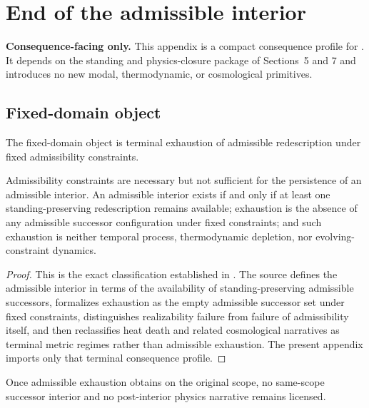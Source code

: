 \section{End of the admissible interior}
\label{app:interior-end}

\begin{fixedbox}
\textbf{Consequence-facing only.} This appendix is a compact consequence profile for \interiorenddoc{}. It depends on the standing and physics-closure package of Sections~5 and 7 and introduces no new modal, thermodynamic, or cosmological primitives.
\end{fixedbox}

\subsection*{Fixed-domain object}
The fixed-domain object is terminal exhaustion of admissible redescription under fixed admissibility constraints.

\begin{proposition}
Admissibility constraints are necessary but not sufficient for the persistence of an admissible interior. An admissible interior exists if and only if at least one standing-preserving redescription remains available; exhaustion is the absence of any admissible successor configuration under fixed constraints; and such exhaustion is neither temporal process, thermodynamic depletion, nor evolving-constraint dynamics.
\end{proposition}

\begin{proof}
This is the exact classification established in \interiorenddoc{}. The source defines the admissible interior in terms of the availability of standing-preserving admissible successors, formalizes exhaustion as the empty admissible successor set under fixed constraints, distinguishes realizability failure from failure of admissibility itself, and then reclassifies heat death and related cosmological narratives as terminal metric regimes rather than admissible exhaustion. The present appendix imports only that terminal consequence profile.\cite{MaleyEndInterior}
\end{proof}

\begin{corollary}
Once admissible exhaustion obtains on the original scope, no same-scope successor interior and no post-interior physics narrative remains licensed.
\end{corollary}

